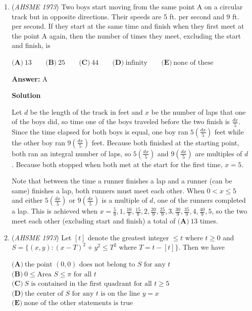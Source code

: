 \begin{enumerate}
 


	\item (\textit{AHSME 1973}) Two boys start moving from the same point A on a circular track but in opposite directions. Their speeds are 5 ft. per second and 9 ft. per second. If they start at the same time and finish when they first meet at the point A again, then the number of times they meet, excluding the start and finish, is 


 $\textbf{(A)}\ 13 \qquad \textbf{(B)}\ 25 \qquad \textbf{(C)}\ 44 \qquad \textbf{(D)}\ \text{infinity} \qquad \textbf{(E)}\ \text{none of these}$

 \textbf{Answer: }A



\textbf{Solution}

Let $d$ be the length of the track in feet and $x$ be the number of laps that one of the boys did, so time one of the boys traveled before the two finish is $\frac{dx}{5}$.  Since the time elapsed for both boys is equal, one boy ran $5(\frac{dx}{5})$ feet while the other boy ran $9(\frac{dx}{5})$ feet.  Because both finished at the starting point, both ran an integral number of laps, so $5(\frac{dx}{5})$ and $9(\frac{dx}{5})$ are multiples of $d$.  Because both stopped when both met at the start for the first time, $x = 5$.

 Note that between the time a runner finishes a lap and a runner (can be same) finishes a lap, both runners must meet each other.  When $0 < x \le 5$ and either $5(\frac{dx}{5})$ or $9(\frac{dx}{5})$ is a multiple of $d$, one of the runners completed a lap.  This is achieved when $x = \frac59, 1, \frac{10}{9}, \frac{15}{9}, 2, \frac{20}{9}, \frac{25}{9}, 3, \frac{30}{9}, \frac{35}{9}, 4, \frac{40}{9}, 5$, so the two meet each other (excluding start and finish) a total of $\boxed{\textbf{(A)}\ 13}$ times.

 


	\item (\textit{AHSME 1973}) Let $[t]$ denote the greatest integer $\leq t$ where $t \geq 0$ and $S = \{(x,y): (x-T)^2 + y^2 \leq T^2 \text{ where } T = t - [t]\}$. Then we have 


 $\textbf{(A)}\ \text{the point } (0,0) \text{ does not belong to } S \text{ for any } t \qquad$
$\textbf{(B)}\ 0 \leq \text{Area } S \leq \pi \text{ for all } t \qquad$
$\textbf{(C)}\ S \text{ is contained in the first quadrant for all } t \geq 5 \qquad$
$\textbf{(D)}\ \text{the center of } S \text{ for any } t \text{ is on the line } y=x \qquad$
$\textbf{(E)}\ \text{none of the other statements is true}$


\end{enumerate}
